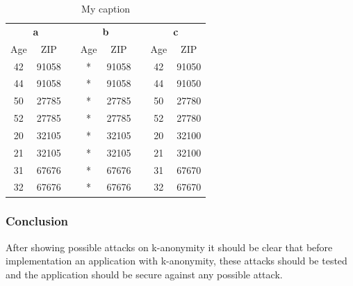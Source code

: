\documentclass{llncs}
\begin{document}
\begin{table}[]
	\centering
	\caption{My caption}
	\label{my-label}
	\begin{tabular}{@{}cccccccc@{}}
		\multicolumn{2}{c}{\textbf{a}} & \multicolumn{1}{l}{} & \multicolumn{2}{c}{\textbf{b}} & \multicolumn{1}{l}{} & \multicolumn{2}{c}{\textbf{c}} \\ \cline{1-2} \cline{4-5} \cline{7-8} 
		Age           & ZIP            &                      & Age           & ZIP            &                      & Age           & ZIP            \\ \cline{1-2} \cline{4-5} \cline{7-8} 
		42            & 91058          &                      & *             & 91058          &                      & 42            & 91050          \\
		44            & 91058          &                      & *             & 91058          &                      & 44            & 91050          \\
		50            & 27785          &                      & *             & 27785          &                      & 50            & 27780          \\
		52            & 27785          &                      & *             & 27785          &                      & 52            & 27780          \\
		20            & 32105          &                      & *             & 32105          &                      & 20            & 32100          \\
		21            & 32105          &                      & *             & 32105          &                      & 21            & 32100          \\
		31            & 67676          &                      & *             & 67676          &                      & 31            & 67670          \\
		32            & 67676          &                      & *             & 67676          &                      & 32            & 67670          \\ \cline{1-2} \cline{4-5} \cline{7-8} 
	\end{tabular}
\end{table}

\subsubsection{Conclusion}
After showing possible attacks on k-anonymity it should be clear that before implementation an application with k-anonymity, these attacks should be tested and the application should be secure against any possible attack. 
\end{document}
